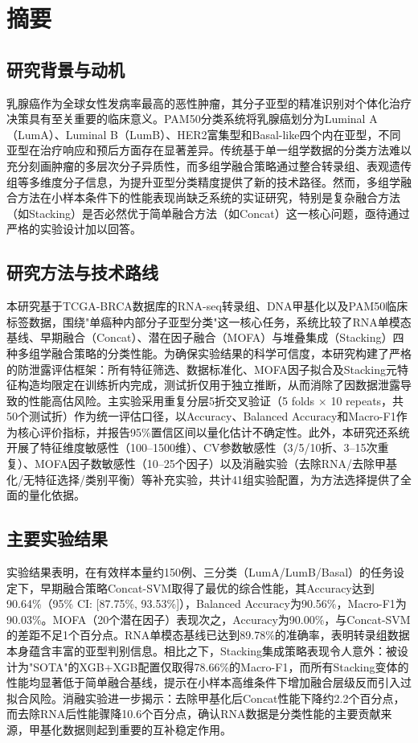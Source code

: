 \section{摘要}

\subsection{研究背景与动机}

乳腺癌作为全球女性发病率最高的恶性肿瘤，其分子亚型的精准识别对个体化治疗决策具有至关重要的临床意义。PAM50分类系统将乳腺癌划分为Luminal A（LumA）、Luminal B（LumB）、HER2富集型和Basal-like四个内在亚型，不同亚型在治疗响应和预后方面存在显著差异。传统基于单一组学数据的分类方法难以充分刻画肿瘤的多层次分子异质性，而多组学融合策略通过整合转录组、表观遗传组等多维度分子信息，为提升亚型分类精度提供了新的技术路径。然而，多组学融合方法在小样本条件下的性能表现尚缺乏系统的实证研究，特别是复杂融合方法（如Stacking）是否必然优于简单融合方法（如Concat）这一核心问题，亟待通过严格的实验设计加以回答。

\subsection{研究方法与技术路线}

本研究基于TCGA-BRCA数据库的RNA-seq转录组、DNA甲基化以及PAM50临床标签数据，围绕"单癌种内部分子亚型分类"这一核心任务，系统比较了RNA单模态基线、早期融合（Concat）、潜在因子融合（MOFA）与堆叠集成（Stacking）四种多组学融合策略的分类性能。为确保实验结果的科学可信度，本研究构建了严格的防泄露评估框架：所有特征筛选、数据标准化、MOFA因子拟合及Stacking元特征构造均限定在训练折内完成，测试折仅用于独立推断，从而消除了因数据泄露导致的性能高估风险。主实验采用重复分层5折交叉验证（5 folds $\times$ 10 repeats，共50个测试折）作为统一评估口径，以Accuracy、Balanced Accuracy和Macro-F1作为核心评价指标，并报告95\%置信区间以量化估计不确定性。此外，本研究还系统开展了特征维度敏感性（100--1500维）、CV参数敏感性（3/5/10折、3--15次重复）、MOFA因子数敏感性（10--25个因子）以及消融实验（去除RNA/去除甲基化/无特征选择/类别平衡）等补充实验，共计41组实验配置，为方法选择提供了全面的量化依据。

\subsection{主要实验结果}

实验结果表明，在有效样本量约150例、三分类（LumA/LumB/Basal）的任务设定下，早期融合策略Concat-SVM取得了最优的综合性能，其Accuracy达到90.64\%（95\% CI: [87.75\%, 93.53\%]），Balanced Accuracy为90.56\%，Macro-F1为90.03\%。MOFA（20个潜在因子）表现次之，Accuracy为90.00\%，与Concat-SVM的差距不足1个百分点。RNA单模态基线已达到89.78\%的准确率，表明转录组数据本身蕴含丰富的亚型判别信息。相比之下，Stacking集成策略表现令人意外：被设计为"SOTA"的XGB+XGB配置仅取得78.66\%的Macro-F1，而所有Stacking变体的性能均显著低于简单融合基线，提示在小样本高维条件下增加融合层级反而引入过拟合风险。消融实验进一步揭示：去除甲基化后Concat性能下降约2.2个百分点，而去除RNA后性能骤降10.6个百分点，确认RNA数据是分类性能的主要贡献来源，甲基化数据则起到重要的互补稳定作用。

